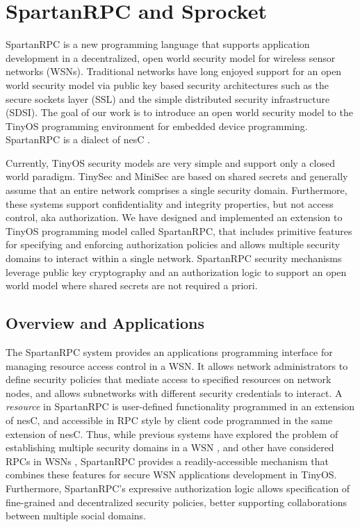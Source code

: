 
\chapter{SpartanRPC and Sprocket}
\label{chapter-spartanrpc-sprocket}

SpartanRPC is a new programming language that supports application
development in a decentralized, open world security model for wireless
sensor networks (WSNs). Traditional networks have long enjoyed support
for an open world security model via public key based security
architectures such as the secure sockets layer (SSL) and the simple
distributed security infrastructure (SDSI). The goal of our work is to
introduce an open world security model to the TinyOS programming
environment for embedded device programming. SpartanRPC is a dialect
of nesC \cite{Gay-nesC-2003}.

Currently, TinyOS security models are very simple and support only a
closed world paradigm. TinySec \cite{karlog-tinysec-2004} and MiniSec
\cite{luk-minisec-2007} are based on shared secrets and generally
assume that an entire network comprises a single security
domain. Furthermore, these systems support confidentiality and
integrity properties, but not access control, aka authorization. We
have designed and implemented an extension to TinyOS programming model
\cite{Gay-nesC-2003} called SpartanRPC, that includes primitive
features for specifying and enforcing authorization policies and
allows multiple security domains to interact within a single network.
SpartanRPC security mechanisms leverage public key cryptography and an
authorization logic to support an open world model where shared
secrets are not required a priori.

\section{Overview and Applications}
\label{section-overview}

The SpartanRPC system provides an applications programming interface
for managing resource access control in a WSN. It allows network
administrators to define security policies that mediate access to
specified resources on network nodes, and allows subnetworks with
different security credentials to interact. A \emph{resource} in
SpartanRPC is user-defined functionality programmed in an extension of
nesC, and accessible in RPC style by client code programmed in the
same extension of nesC. Thus, while previous systems have explored the
problem of establishing multiple security domains in a WSN
\cite{Claycomb:2011:NNL:1889383.1889450}, and other have considered
RPCs in WSNs \cite{may-tinyrpc-2007}, SpartanRPC provides a
readily-accessible mechanism that combines these features for secure
WSN applications development in TinyOS. Furthermore, SpartanRPC's
expressive authorization logic allows specification of fine-grained
and decentralized security policies, better supporting collaborations
between multiple social domains.

